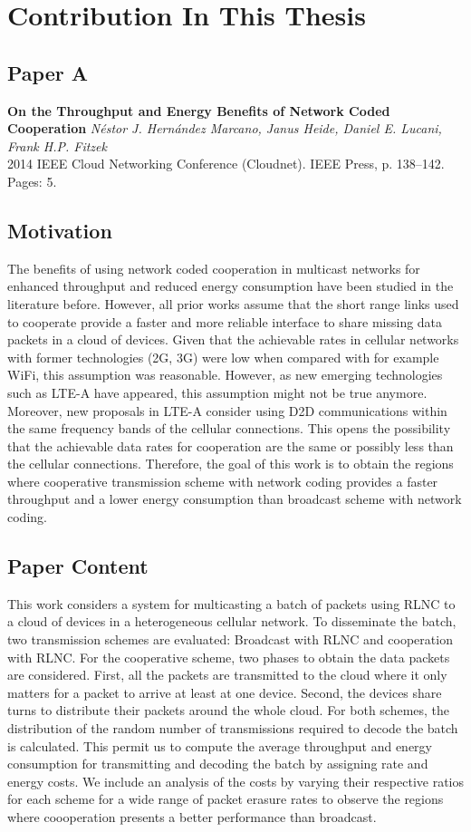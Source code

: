 \section{Contribution In This Thesis}\label{sec:contributions}

\subsection{Paper A}
\textbf{On the Throughput and Energy Benefits of Network Coded Cooperation}
\textit{N\'estor J. Hern\'andez Marcano, Janus Heide, Daniel E. Lucani, Frank H.P. Fitzek}
\\  2014 IEEE Cloud Networking Conference (Cloudnet). IEEE Press, p. 138--142.
\\ Pages: 5.

\subsection*{Motivation}
The benefits of using network coded cooperation in multicast networks for enhanced throughput and reduced energy consumption have been studied in the literature before. However, all prior works assume that the short range links used to cooperate provide a faster and more reliable interface to share missing data packets in a cloud of devices. Given that the achievable rates in cellular networks with former technologies (2G, 3G) were low when compared with for example WiFi, this assumption was reasonable. However, as new emerging technologies such as LTE-A have appeared, this assumption might not be true anymore. Moreover, new proposals in LTE-A consider using D2D communications within the same frequency bands of the cellular connections. This opens the possibility that the achievable data rates for cooperation are the same or possibly less than the cellular connections. Therefore, the goal of this work is to obtain the regions where cooperative transmission scheme with network coding provides a faster throughput and a lower energy consumption than broadcast scheme with network coding.

\subsection*{Paper Content}
This work considers a system for multicasting a batch of packets using RLNC to a cloud of devices in a heterogeneous cellular network. To disseminate the batch, two transmission schemes are evaluated: Broadcast with RLNC and cooperation with RLNC. For the cooperative scheme, two phases to obtain the data packets are considered. First, all the packets are transmitted to the cloud where it only matters for a packet to arrive at least at one device. Second, the devices share turns to distribute their packets around the whole cloud. For both schemes, the distribution of the random number of transmissions required to decode the batch is calculated. This permit us to compute the average throughput and energy consumption for transmitting and decoding the batch by assigning rate and energy costs. We include an analysis of the costs by varying their respective ratios for each scheme for a wide range of packet erasure rates to observe the regions where coooperation presents a better performance than broadcast.


